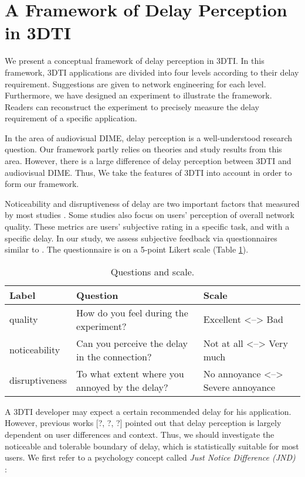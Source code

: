 \section{A Framework of Delay Perception in 3DTI}

We present a conceptual framework of delay perception in 3DTI. In this framework, 3DTI applications are divided into four levels according to their delay requirement. Suggestions are given to network engineering for each level. Furthermore, we have designed an experiment to illustrate the framework. Readers can reconstruct the experiment to precisely measure the delay requirement of a specific application.

In the area of audiovisual DIME, delay perception is a well-understood research question. Our framework partly relies on theories and study results from this area. However, there is a large difference of delay perception between 3DTI and audiovisual DIME. Thus, We take the features of 3DTI into account in order to form our framework.

Noticeability and disruptiveness of delay are two important factors that measured by most studies \cite{wu2009quality, schmitt2014influence, geerts2011we, schmitt2014asymmetric}. Some studies also focus on users' perception of overall network quality. These metrics are users' subjective rating in a specific task, and with a specific delay. In our study, we assess subjective feedback via questionnaires similar to \cite{schmitt2014influence}. The questionnaire is on a 5-point Likert scale (Table \ref{tab:table_questionnaire}).

\begin{table} [!htbp]
\begin{tabular}{|p{}|p{}|p{}|}
\hline 
Label & Question & Scale \\
\hline
quality & How do you feel during the experiment? & Excellent <--> Bad \\
\hline
noticeability & Can you perceive the delay in the connection? & Not at all <--> Very much \\
\hline
disruptiveness & To what extent where you annoyed by the delay? & No annoyance <--> Severe annoyance \\
\hline
\end{tabular}
\caption{Questions and scale.}
\label{tab:table_questionnaire}
\end{table}

A 3DTI developer may expect a certain recommended delay for his application. However, previous works \cite{montagud2012inter} [?, ?, ?] pointed out that delay perception is largely dependent on user differences and context. Thus, we should investigate the noticeable and tolerable boundary of delay, which is statistically suitable for most users. We first refer to a psychology concept called \emph{Just Notice Difference (JND)} \cite{xu2013exploiting, sat2009statistical}:

